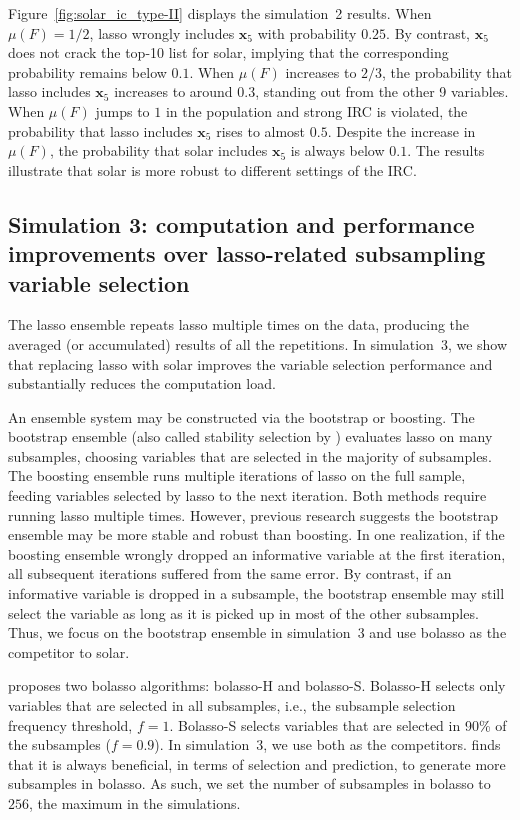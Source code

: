 \documentclass[12pt]{article}
\begin{document}
Figure~\ref{fig:solar_ic_type-II} displays the simulation~2 results. When $\mu \left( F \right) = 1/2$, lasso wrongly includes $\mathbf{x}_5$ with probability $0.25$. By contrast, $\mathbf{x}_5$ does not crack the top-10 list for solar, implying that the corresponding probability remains below $0.1$. When $\mu \left( F \right)$ increases to $2/3$, the probability that lasso includes $\mathbf{x}_5$ increases to around $0.3$, standing out from the other 9 variables. When $\mu \left( F \right)$ jumps to $1$ in the population and strong IRC is violated, the probability that lasso includes $\mathbf{x}_5$ rises to almost $0.5$. Despite the increase in $\mu\left(F\right)$, the probability that solar includes $\mathbf{x}_5$ is always below $0.1$. The results illustrate that solar is more robust to different settings of the IRC.

\subsection{Simulation 3: computation and performance improvements over lasso-related subsampling variable selection}

The lasso ensemble repeats lasso multiple times on the data, producing the averaged (or accumulated) results of all the repetitions. In simulation~3, we show that replacing lasso with solar improves the variable selection performance and substantially reduces the computation load.

An ensemble system may be constructed via the bootstrap or boosting. The bootstrap ensemble (also called stability selection by \citet{meinshausen2010stability}) evaluates lasso on many subsamples, choosing variables that are selected in the majority of subsamples. The boosting ensemble runs multiple iterations of lasso on the full sample, feeding variables selected by lasso to the next iteration. Both methods require running lasso multiple times. However, previous research suggests the bootstrap ensemble may be more stable and robust than boosting. In one realization, if the boosting ensemble wrongly dropped an informative variable at the first iteration, all subsequent iterations suffered from the same error. By contrast, if an informative variable is dropped in a subsample, the bootstrap ensemble may still select the variable as long as it is picked up in most of the other subsamples. Thus, we focus on the bootstrap ensemble in simulation~3 and use bolasso \citep{bach2008bolasso} as the competitor to solar.

\citet{bach2008bolasso} proposes two bolasso algorithms: bolasso-H and bolasso-S. Bolasso-H selects only variables that are selected in all subsamples, i.e., the subsample selection frequency threshold, $f=1$. Bolasso-S selects variables that are selected in 90\% of the subsamples ($f=0.9$). In simulation~3, we use both as the competitors. \citet{bach2008bolasso} finds that it is always beneficial, in terms of selection and prediction, to generate more subsamples in bolasso. As such, we set the number of subsamples in bolasso to $256$, the maximum in the \citet{bach2008bolasso} simulations.
\end{document}
